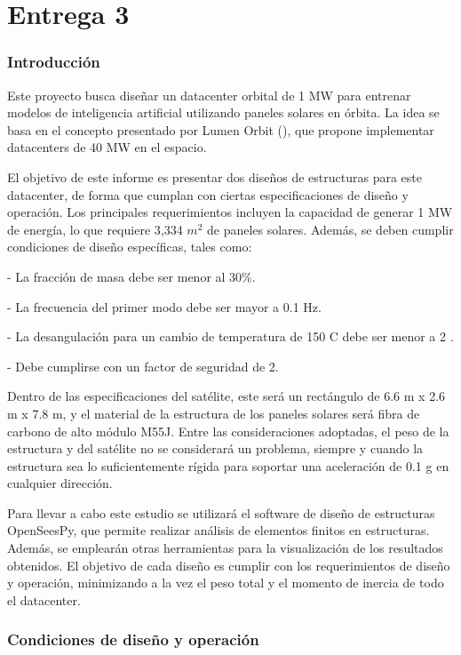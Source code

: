 \part{Entrega 3}

\section{Introducción}

Este proyecto busca diseñar un datacenter orbital de 1 MW para entrenar modelos de inteligencia artificial utilizando paneles solares en órbita. La idea se basa en el concepto presentado por Lumen Orbit (\cite{lumenorbit}), que propone implementar datacenters de 40 MW en el espacio.

El objetivo de este informe es presentar dos diseños de estructuras para este datacenter, de forma que cumplan con ciertas especificaciones de diseño y operación. Los principales requerimientos incluyen la capacidad de generar 1 MW de energía, lo que requiere 3,334 $m^2$ de paneles solares. Además, se deben cumplir condiciones de diseño específicas, tales como:

- La fracción de masa debe ser menor al 30\%.

- La frecuencia del primer modo debe ser mayor a 0.1 Hz.

- La desangulación para un cambio de temperatura de 150 \textdegree{}C debe ser menor a 2 \textdegree.

- Debe cumplirse con un factor de seguridad de 2.

Dentro de las especificaciones del satélite, este será un rectángulo de 6.6 m x 2.6 m x 7.8 m, y el material de la estructura de los paneles solares será fibra de carbono de alto módulo M55J. Entre las consideraciones adoptadas, el peso de la estructura y del satélite no se considerará un problema, siempre y cuando la estructura sea lo suficientemente rígida para soportar una aceleración de 0.1 g en cualquier dirección.

Para llevar a cabo este estudio se utilizará el software de diseño de estructuras OpenSeesPy, que permite realizar análisis de elementos finitos en estructuras. Además, se emplearán otras herramientas para la visualización de los resultados obtenidos. El objetivo de cada diseño es cumplir con los requerimientos de diseño y operación, minimizando a la vez el peso total y el momento de inercia de todo el datacenter.

\newpage
\section{Condiciones de diseño y operación}

